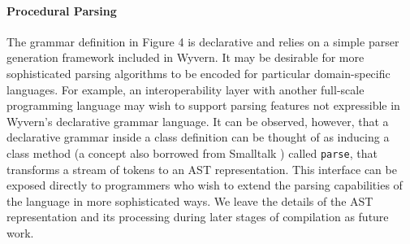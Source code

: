 \paragraph{Procedural Parsing}
The grammar definition in Figure 4 is declarative and relies on a simple parser generation framework included in Wyvern. It may be desirable for more sophisticated parsing algorithms to be encoded for particular domain-specific languages. For example, an interoperability layer with another full-scale programming language may wish to support parsing features not expressible in Wyvern's declarative grammar language. It can be observed, however, that a declarative grammar inside a class definition can be thought of as inducing a class method (a concept also borrowed from Smalltalk \cite{smalltalk}) called \verb|parse|, that transforms a stream of tokens to an AST representation. This interface can be exposed directly to programmers who wish to extend the parsing capabilities of the language in more sophisticated ways. We leave the details of the AST representation and its processing during later stages of compilation as future work.

